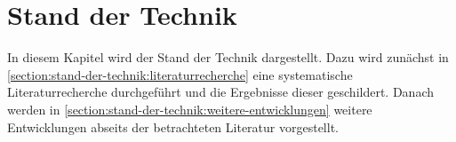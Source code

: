 \chapter{Stand der Technik}\label{section:stand-der-technik}

In diesem Kapitel wird der Stand der Technik dargestellt. Dazu wird zunächst in \autoref{section:stand-der-technik:literaturrecherche} eine systematische Literaturrecherche durchgeführt und die Ergebnisse dieser geschildert. Danach werden in \autoref{section:stand-der-technik:weitere-entwicklungen} weitere Entwicklungen abseits der betrachteten Literatur vorgestellt.


